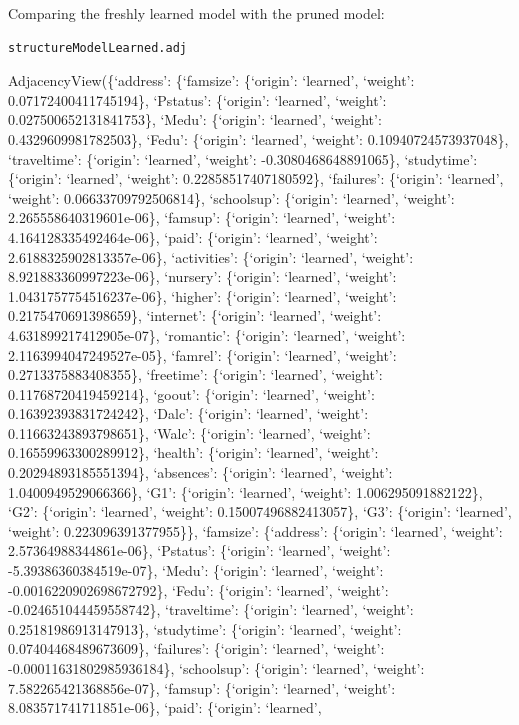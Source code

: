 \documentclass[
]{article}
\begin{document}
Comparing the freshly learned model with the pruned model:

\begin{verbatim}
structureModelLearned.adj
\end{verbatim}

AdjacencyView(\{`address': \{`famsize': \{`origin': `learned', `weight':
0.07172400411745194\}, `Pstatus': \{`origin': `learned', `weight':
0.027500652131841753\}, `Medu': \{`origin': `learned', `weight':
0.4329609981782503\}, `Fedu': \{`origin': `learned', `weight':
0.10940724573937048\}, `traveltime': \{`origin': `learned', `weight':
-0.3080468648891065\}, `studytime': \{`origin': `learned', `weight':
0.22858517407180592\}, `failures': \{`origin': `learned', `weight':
0.06633709792506814\}, `schoolsup': \{`origin': `learned', `weight':
2.265558640319601e-06\}, `famsup': \{`origin': `learned', `weight':
4.164128335492464e-06\}, `paid': \{`origin': `learned', `weight':
2.6188325902813357e-06\}, `activities': \{`origin': `learned', `weight':
8.921883360997223e-06\}, `nursery': \{`origin': `learned', `weight':
1.0431757754516237e-06\}, `higher': \{`origin': `learned', `weight':
0.2175470691398659\}, `internet': \{`origin': `learned', `weight':
4.631899217412905e-07\}, `romantic': \{`origin': `learned', `weight':
2.1163994047249527e-05\}, `famrel': \{`origin': `learned', `weight':
0.2713375883408355\}, `freetime': \{`origin': `learned', `weight':
0.11768720419459214\}, `goout': \{`origin': `learned', `weight':
0.16392393831724242\}, `Dalc': \{`origin': `learned', `weight':
0.11663243893798651\}, `Walc': \{`origin': `learned', `weight':
0.16559963300289912\}, `health': \{`origin': `learned', `weight':
0.20294893185551394\}, `absences': \{`origin': `learned', `weight':
1.0400949529066366\}, `G1': \{`origin': `learned', `weight':
1.006295091882122\}, `G2': \{`origin': `learned', `weight':
0.15007496882413057\}, `G3': \{`origin': `learned', `weight':
0.223096391377955\}\}, `famsize': \{`address': \{`origin': `learned',
`weight': 2.57364988344861e-06\}, `Pstatus': \{`origin': `learned',
`weight': -5.39386360384519e-07\}, `Medu': \{`origin': `learned',
`weight': -0.0016220902698672792\}, `Fedu': \{`origin': `learned',
`weight': -0.024651044459558742\}, `traveltime': \{`origin': `learned',
`weight': 0.25181986913147913\}, `studytime': \{`origin': `learned',
`weight': 0.07404468489673609\}, `failures': \{`origin': `learned',
`weight': -0.00011631802985936184\}, `schoolsup': \{`origin': `learned',
`weight': 7.582265421368856e-07\}, `famsup': \{`origin': `learned',
`weight': 8.083571741711851e-06\}, `paid': \{`origin': `learned',
\end{document}
